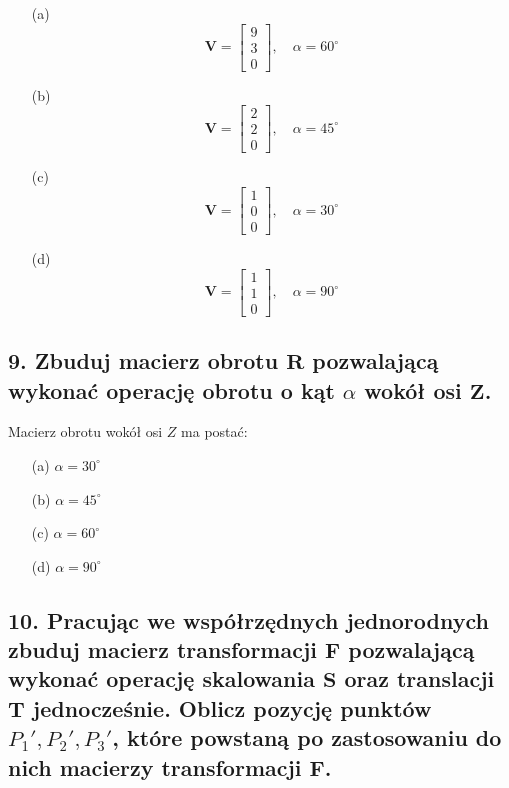 \begin{enumerate}
    \item[(a)] 
    \[
    \mathbf{V} = \begin{bmatrix} 9 \\ 3 \\ 0 \end{bmatrix}, \quad \alpha = 60^\circ
    \]

    \item[(b)] 
    \[
    \mathbf{V} = \begin{bmatrix} 2 \\ 2 \\ 0 \end{bmatrix}, \quad \alpha = 45^\circ
    \]

    \item[(c)] 
    \[
    \mathbf{V} = \begin{bmatrix} 1 \\ 0 \\ 0 \end{bmatrix}, \quad \alpha = 30^\circ
    \]

    \item[(d)] 
    \[
    \mathbf{V} = \begin{bmatrix} 1 \\ 1 \\ 0 \end{bmatrix}, \quad \alpha = 90^\circ
    \]
\end{enumerate}



\subsection*{9. Zbuduj macierz obrotu \( \mathbf{R} \) pozwalającą wykonać operację obrotu o kąt \( \alpha \) wokół osi \( \mathbf{Z} \).}

Macierz obrotu wokół osi \( Z \) ma postać:


\begin{enumerate}
    \item[(a)] \( \alpha = 30^\circ \)
    \item[(b)] \( \alpha = 45^\circ \)
    \item[(c)] \( \alpha = 60^\circ \)
    \item[(d)] \( \alpha = 90^\circ \)
\end{enumerate}



\subsection*{10. Pracując we współrzędnych jednorodnych zbuduj macierz transformacji \( \mathbf{F} \) pozwalającą wykonać operację skalowania \( \mathbf{S} \) oraz translacji \( \mathbf{T} \) jednocześnie. 
Oblicz pozycję punktów \( P_1', P_2', P_3' \), które powstaną po zastosowaniu do nich macierzy transformacji \( \mathbf{F} \).}

